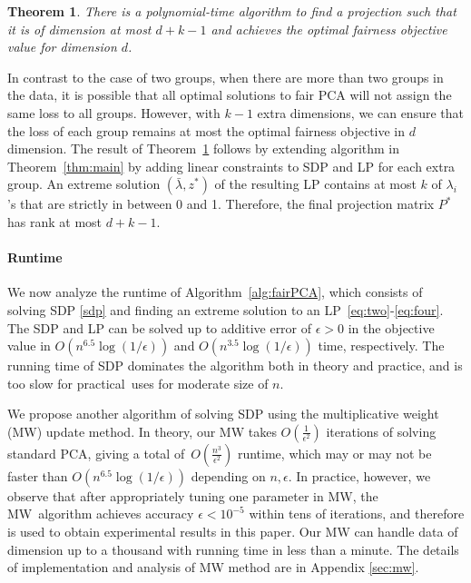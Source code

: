 \documentclass{article}
\newtheorem{theorem}{Theorem}[section]
\begin{document}
\begin{theorem}
\label{thm:k-group}
There is a polynomial-time algorithm to find a projection such that it is of dimension at most $d+k-1$ and achieves  the optimal fairness objective value for dimension $d$.
\end{theorem}
In contrast to the case of two groups, when there are more than two groups in the data, it is possible that all optimal solutions to fair
PCA will not assign the same loss
to all groups. However, with \(k-1\) extra dimensions, we can ensure
that the loss of each group remains at most the optimal fairness
objective in \(d\) dimension. The result of Theorem~\ref{thm:k-group}
follows by extending algorithm in Theorem~\ref{thm:main} by adding
linear constraints to SDP and LP for each extra group. An extreme
solution \((\bar{\lambda},z^*)\) of the resulting LP contains at most
\(k\) of \(\lambda_i\)'s that are strictly in between 0 and
1. Therefore, the final projection matrix \(P^*\) has rank at most
\(d+k-1\).

\paragraph{Runtime} We now analyze the runtime of Algorithm~\ref{alg:fairPCA}, which consists of solving SDP \eqref{sdp} and finding an extreme solution to an LP~\eqref{eq:two}-\eqref{eq:four}. The SDP and LP can be solved up to additive error of \(\epsilon>0\) in the objective value   in \(O(n^{6.5}\log(1/\epsilon))\)  \citep{ben2001lectures} and \(O(n^{3.5}\log(1/\epsilon)) \)  \citep{schrijver1998theory} time, respectively. The running time of SDP dominates the algorithm both in theory and practice, and is too slow for practical\ uses for moderate size of \(n\).

We propose another algorithm of solving SDP using the multiplicative
weight (MW) update method. In theory, our MW takes
\(O(\frac{1}{\epsilon^2})\) iterations of solving standard PCA, giving a total of\ \(O(\frac{n^3}{\epsilon^2})\) runtime, which may or may not be faster than
\(O(n^{6.5}\log(1/\epsilon))\) depending on
\(n,\epsilon\). In practice, however, we observe that after appropriately tuning one parameter in MW, the MW\ algorithm achieves accuracy \(\epsilon<10^{-5}\) within tens of iterations, and therefore is used to obtain experimental results in this paper. Our MW can handle data of
dimension up to a thousand with running time in less than a
minute. The details of implementation and analysis of MW method are in
Appendix \ref{sec:mw}.
\end{document}
